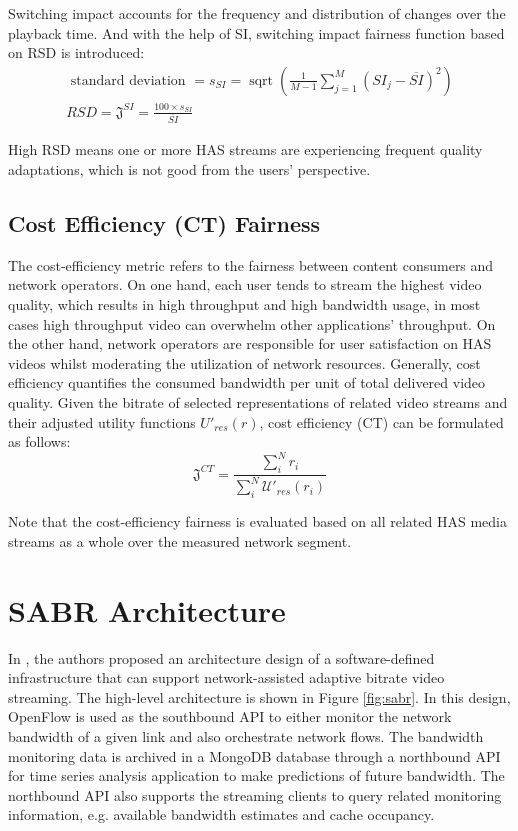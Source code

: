 \documentclass[12pt]{article}
\begin{document}
Switching impact accounts for the frequency and distribution of changes over the playback time. And with the help of SI, switching impact fairness function based on RSD is introduced:
\begin{equation}
\begin{gathered}
\text { standard deviation }=s_{S I}=\operatorname{sqrt}\left(\frac{1}{M-1} \sum_{j=1}^{M}\left(S I_{j}-\overline{S I}\right)^{2}\right) \\
R S D=\mathfrak{J}^{S I}=\frac{100 \times s_{S I}}{\overline{S I}}
\end{gathered}
\end{equation}

High RSD means one or more HAS streams are experiencing frequent quality adaptations, which is not good from the users' perspective.

\subsection{Cost Efficiency (CT) Fairness}
The cost-efficiency metric refers to the fairness between content consumers and network operators. On one hand, each user tends to stream the highest video quality, which results in high throughput and high bandwidth usage, in most cases high throughput video can overwhelm other applications’ throughput. On the other hand, network operators are responsible for user satisfaction on HAS videos whilst moderating the utilization of network resources.
Generally, cost efficiency quantifies the consumed bandwidth per unit of total delivered video quality. Given the bitrate of selected representations of related video streams and their adjusted utility functions $U\prime_{res}(r)$, cost efficiency (CT) can be formulated as follows:
\begin{equation}
\mathfrak{J}^{C T}=\frac{\sum_{i}^{N} r_{i}}{\sum_{i}^{N} \mathcal{U\prime}_{r e s}\left(r_{i}\right)}
\end{equation}

Note that the cost-efficiency fairness is evaluated based on all related HAS media streams as a whole over the measured network segment.



\newpage
\section{SABR Architecture}
In \cite{bhat_network_2017}, the authors proposed an architecture design of a software-defined infrastructure that can support network-assisted adaptive bitrate video streaming. The high-level architecture is shown in Figure \ref{fig:sabr}. In this design, OpenFlow is used as the southbound API to either monitor the network bandwidth of a given link and also orchestrate network flows. The bandwidth monitoring data is archived in a MongoDB database through a northbound API for time series analysis application to make predictions of future bandwidth. The northbound API also supports the streaming clients to query related monitoring information, e.g. available bandwidth estimates and cache occupancy. 
\end{document}
